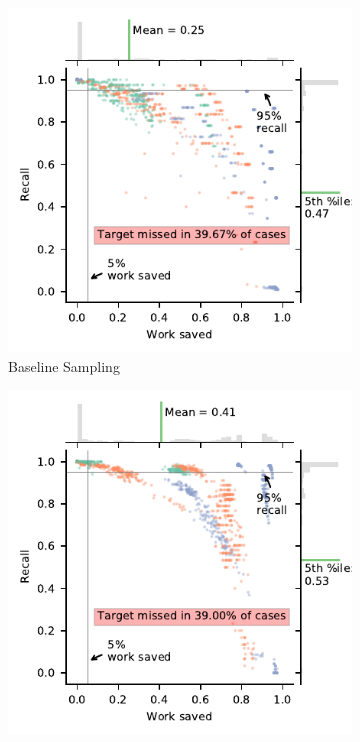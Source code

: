 \documentclass{bmcart}
\begin{document}
    \begin{figure}
	\centering
	\begin{subfigure}[b]{0.475\textwidth}
		\centering
		\includegraphics[width=\textwidth]{../images/jointplot_bir}
		\caption[Network2]%
		{{\small Baseline Sampling}}    
		\label{fig:bir}
	\end{subfigure}
	\hfill
	\begin{subfigure}[b]{0.475\textwidth}  
		\centering 
		\includegraphics[width=\textwidth]{../images/jointplot_ih_50}

\end{subfigure}
\end{figure}
\end{document}
